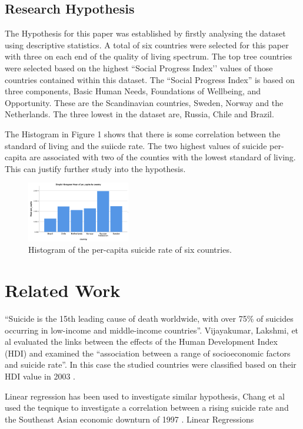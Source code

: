 \documentclass[conference]{IEEEtran}
\begin{document}
\subsection{Research Hypothesis}
The Hypothesis for this paper was established by firstly analysing the dataset using descriptive statistics.
A total of six countries were selected for this paper with three on each end of the quality of living spectrum.
The top tree countries were selected based on the highest ``Social Progress Index’’ values of those countries contained within this dataset.
The ``Social Progress Index'' is based on three components, Basic Human Needs, Foundations of Wellbeing, and Opportunity\cite{high_standard_living}.
These are the Scandinavian countries, Sweden, Norway and the Netherlands.
The three lowest in the dataset are, Russia, Chile and Brazil.

The Histogram in Figure 1 shows that there is some correlation between the standard of living and the suiicde rate.
The two highest values of suicide per-capita are associated with two of the counties with the lowest standard of living.
This can justify further study into the hypothesis.

    \begin{figure}[h]
        \centering
        \includegraphics[width=0.4\textwidth]{percapita_bar}
        \caption{Histogram of the per-capita suicide rate of six countries.}
    \end{figure}

\section{Related Work}
``Suicide is the 15th leading cause of death worldwide, with over 75\% of suicides occurring in low-income and middle-income countries''\cite{sui_low_income}.
Vijayakumar, Lakshmi, et al evaluated the links between the effects of the Human Development Index (HDI) and examined the
``association between a range of socioeconomic factors and suicide rate''.
In this case the studied countries were classified based on their HDI value in 2003 \cite{Sui_in_developing}.

Linear regression has been used to investigate similar hypothesis, Chang et al used the teqnique to investigate a 
correlation between a rising suicide rate and the Southeast Asian economic downturn of 1997 \cite{SEAsia_sui}.
Linear Regressions 
\end{document}
